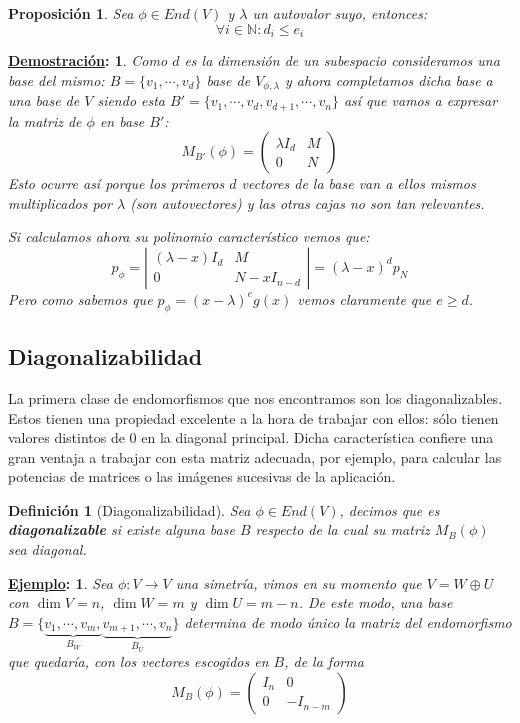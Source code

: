 \documentclass[10pt,a4paper,openright]{book}
\theoremstyle{break}
\newtheorem*{defi}{Definición}
\newtheorem*{prop}{Proposición}
\newtheorem*{demo}{\underline{Demostración}:}
\newtheorem*{ej}{\underline{Ejemplo}:}
\begin{document}
\begin{prop}
Sea $\phi \in End(V)$ y $\lambda$ un autovalor suyo, entonces:
$$
\forall i \in \mathbb N: d_i\leq e_i
$$
\end{prop}
\begin{demo}
Como $d$ es la dimensión de un subespacio consideramos una base del mismo: $B=\{v_1, \cdots, v_d\}$ base de $V_{\phi, \lambda}$ y ahora completamos dicha base a una base de $V$ siendo esta $B'=\{v_1,\cdots,v_d, v_{d+1},\cdots, v_n\}$ así que vamos a expresar la matriz de $\phi$ en base $B'$:
$$M_{B'}(\phi)=\left(\begin{array}{c|c}\lambda I_d & M \\ \hline 0 & N \end{array}\right)$$
Esto ocurre así porque los primeros $d$ vectores de la base van a ellos mismos multiplicados por $\lambda$ (son autovectores) y las otras cajas no son tan relevantes.

Si calculamos ahora su polinomio característico vemos que:
$$p_\phi=\left|\begin{array}{c|c}(\lambda-x) I_d & M\\ \hline 0 & N-xI_{n-d} \end{array}\right|=(\lambda-x)^d p_N$$
Pero como sabemos que $p_\phi=(x-\lambda)^e g(x)$ vemos claramente que $e\geq d$.
\end{demo}

\subsection{Diagonalizabilidad}
La primera clase de endomorfismos que nos encontramos son los diagonalizables. Estos tienen una propiedad excelente a la hora de trabajar con ellos: sólo tienen valores distintos de $0$ en la diagonal principal. Dicha característica confiere una gran ventaja a trabajar con esta matriz adecuada, por ejemplo, para calcular las potencias de matrices o las imágenes sucesivas de la aplicación.

\begin{defi}[Diagonalizabilidad]
Sea $\phi\in End(V)$, decimos que es \textbf{diagonalizable} si existe alguna base $B$ respecto de la cual su matriz $M_B(\phi)$ sea diagonal.
\end{defi}

\begin{ej}
Sea $\phi: V\rightarrow V$ una simetría, vimos en su momento que $V = W\oplus U$ con $\dim V=n$, $\dim W=m$ y $\dim U = m-n$. De este modo, una base $B=\{\underbrace{v_1, \cdots, v_m,}_{B_W} \underbrace{v_{m+1}, \cdots, v_n}_{B_U}\}$ determina de modo único la matriz del endomorfismo que quedaría, con los vectores escogidos en $B$, de la forma
$$
M_B(\phi)=\left(\begin{array}{c|c} I_n & 0 \\ \hline 0 & -I_{n-m} \end{array}\right)
$$
\end{ej}
\end{document}

